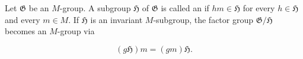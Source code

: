 Let $\mathfrak{G}$ be an $M$-group. A subgroup $\mathfrak{H}$ of $\mathfrak{G}$ is called an  if $hm \in \mathfrak{H}$ for every $h \in \mathfrak{H}$ and every $m \in M$. If $\mathfrak{H}$ is an invariant $M$-subgroup, the factor group $\mathfrak{G}/\mathfrak{H}$ becomes an $M$-group via

$$(g\mathfrak{H})m = (gm)\mathfrak{H}.$$

